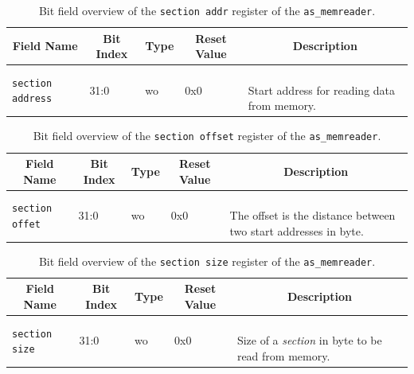 \begin{longtable}[ht]{|l|l|l|l|l|}
    \hline
    \multicolumn{1}{|c|}{\textbf{Field Name}} & \multicolumn{1}{c|}{\textbf{Bit Index}} & \multicolumn{1}{c|}{\textbf{Type}} & \multicolumn{1}{c|}{\textbf{Reset Value}} & \multicolumn{1}{c|}{\textbf{Description}}\\
    \hline
    
    \texttt{section address} & 31:0 & wo & 0x0 & \parbox{5cm}{\ \\
        Start address for reading data from memory.\vspace{0.3em}
    }\\
    \hline
    
    \caption{Bit field overview of the \texttt{section addr} register of the \texttt{as\_memreader}.}
    \label{table:memreader-section_addr-fields}
\end{longtable}


\begin{longtable}[ht]{|l|l|l|l|l|}
    \hline
    \multicolumn{1}{|c|}{\textbf{Field Name}} & \multicolumn{1}{c|}{\textbf{Bit Index}} & \multicolumn{1}{c|}{\textbf{Type}} & \multicolumn{1}{c|}{\textbf{Reset Value}} & \multicolumn{1}{c|}{\textbf{Description}}\\
    \hline
    
    \texttt{section offet} & 31:0 & wo & 0x0 & \parbox{5cm}{\ \\
        The offset is the distance between two start addresses in byte.\vspace{0.3em}
    }\\
    \hline
    
    \caption{Bit field overview of the \texttt{section offset} register of the \texttt{as\_memreader}.}
    \label{table:memreader-section_offset-fields}
\end{longtable}


\begin{longtable}[ht]{|l|l|l|l|l|}
    \hline
    \multicolumn{1}{|c|}{\textbf{Field Name}} & \multicolumn{1}{c|}{\textbf{Bit Index}} & \multicolumn{1}{c|}{\textbf{Type}} & \multicolumn{1}{c|}{\textbf{Reset Value}} & \multicolumn{1}{c|}{\textbf{Description}}\\
    \hline
    
    \texttt{section size} & 31:0 & wo & 0x0 & \parbox{5cm}{\ \\
        Size of a \textit{section} in byte to be read from memory.\vspace{0.3em}
    }\\
    \hline
    
    \caption{Bit field overview of the \texttt{section size} register of the \texttt{as\_memreader}.}
    \label{table:memreader-section_size-fields}
\end{longtable}


